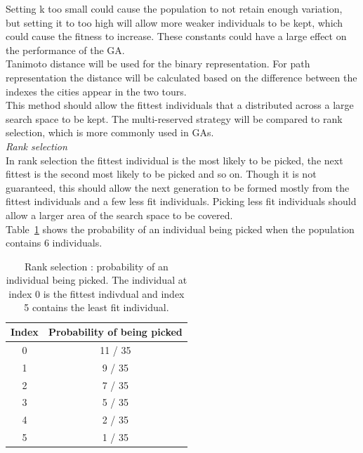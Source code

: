 \documentclass[10pt,a4paper,openbib]{article}
\begin{document}
\begin{multicols}{2}
\noindent Setting k too small could cause the population to not retain enough variation, but setting it to too high will allow more weaker individuals to be kept, which could cause the fitness to increase. These constants could have a large effect on the performance of the GA. \\

\noindent Tanimoto distance will be used for the binary representation. For path representation the distance will be calculated based on the difference between the indexes the cities appear in the two tours. \\

\noindent This method should allow the fittest individuals that a distributed across a large search space to be kept. The multi-reserved strategy will be compared to rank selection, which is more commonly used in GAs.\\

\noindent \textit{Rank selection} \\

\noindent In rank selection the fittest individual is the most likely to be picked, the next fittest is the second most likely to be picked and so on. Though it is not guaranteed, this should allow the next generation to be formed mostly from the fittest individuals and a few less fit individuals. Picking less fit individuals should allow a larger area of the search space to be covered. \cite{baker1985adaptive}\\

\noindent Table~\ref{table:rankSelection} shows the probability of an individual being picked when the population contains 6 individuals. 

\begin{table}[H]
\centering
\begin{tabular}{|c|c|}
\hline
\multicolumn{1}{|l|}{\textbf{Index}} & \multicolumn{1}{l|}{\textbf{Probability of being picked}} \\ \hline
0                                    & 11 / 35                                                   \\ \hline
1                                    & 9 / 35                                                    \\ \hline
2                                    & 7 / 35                                                    \\ \hline
3                                    & 5 / 35                                                    \\ \hline
4                                    & 2 / 35                                                    \\ \hline
5                                    & 1 / 35                                                    \\ \hline
\end{tabular}
\caption{Rank selection : probability of an individual being picked. The individual at index 0 is the fittest indivdual and index 5 contains the least fit individual.}
\label{table:rankSelection}
\end{table}


\end{multicols}
\end{document}
